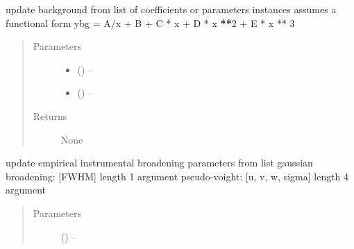 \documentclass[letterpaper,10pt,english]{sphinxmanual}
\begin{document}
\begin{fulllineitems}
\begin{fulllineitems}
\begin{quote}
\begin{description}
\end{description}\end{quote}

\end{fulllineitems}


\begin{fulllineitems}
\label{\detokenize{rst/refinement:mstack.refinement.Refinement.update_background}}
update background from list of coefficients or parameters instances
assumes a functional form ybg = A/x + B + C * x + D * x {\color{red}\bfseries{}**}2 + E * x ** 3
\begin{quote}\begin{description}
\item[{Parameters}] \leavevmode\begin{itemize}
\item {} 
 () -- 

\item {} 
 () -- 

\end{itemize}

\item[{Returns}] \leavevmode
None

\end{description}\end{quote}

\end{fulllineitems}


\begin{fulllineitems}
\label{\detokenize{rst/refinement:mstack.refinement.Refinement.update_broadening}}
update empirical instrumental broadening parameters from list
gaussian broadening: {[}FWHM{]} length 1 argument
pseudo-voight: {[}u, v, w, sigma{]} length 4 argument
\begin{quote}\begin{description}
\item[{Parameters}] \leavevmode
{} () -- 


\end{description}
\end{quote}
\end{fulllineitems}
\end{fulllineitems}
\end{document}
